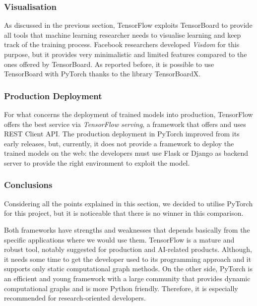 \subsubsection{Visualisation}

As discussed in the previous section, TensorFlow exploits TensorBoard to provide all tools that machine learning researcher needs to visualise learning and keep track of the training process. Facebook researchers developed \textit{Visdom} for this purpose, but it provides very minimalistic and limited features compared to the ones offered by TensorBoard. As reported before, it is possible to use TensorBoard with PyTorch thanks to the library TensorBoardX.

\subsubsection{Production Deployment}

For what concerns the deployment of trained models into production, TensorFlow offers the best service via \textit{TensorFlow serving}, a framework that offers and uses REST Client API.
The production deployment in PyTorch improved from its early releases, but, currently, it does not provide a framework to deploy the trained models on the web: the developers must use Flask or Django as backend server to provide the right environment to exploit the model.

\subsubsection{Conclusions}

Considering all the points explained in this section, we decided to utilise PyTorch for this project, but it is noticeable that there is no winner in this comparison.

Both frameworks have strengths and weaknesses that depends basically from the specific applications where we would use them.
TensorFlow is a mature and robust tool, notably suggested for production and AI-related products. Although, it needs some time to get the developer used to its programming approach and it supports only static computational graph methods. On the other side, PyTorch is an efficient and young framework with a large community that provides dynamic computational graphs and is more Python friendly. Therefore, it is especially recommended for research-oriented developers.